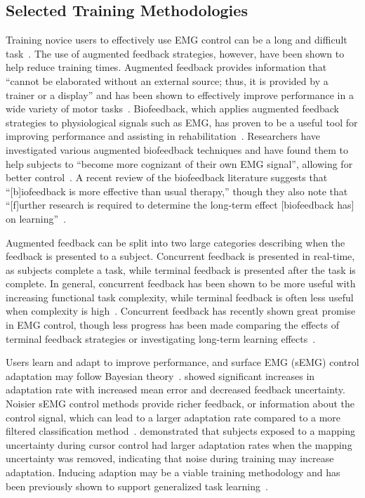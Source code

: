 \subsection{Selected Training Methodologies}
Training novice users to effectively use EMG control can be a long and difficult task~\citep{RN24}.
The use of augmented feedback strategies, however, have been shown to help reduce training times.
Augmented feedback provides information that ``cannot be elaborated without an external source; thus, it is provided by a trainer or a display'' and has been shown to effectively improve performance in a wide variety of motor tasks~\citep{sigrist_augmented_2013}.
Biofeedback, which applies augmented feedback strategies to physiological signals such as EMG, has proven to be a useful tool for improving performance and assisting in rehabilitation~\citep{RN26}.
Researchers have investigated various augmented biofeedback techniques and have found them to help subjects to ``become more cognizant of their own EMG signal'', allowing for better control~\citep{RN27}.
A recent review of the biofeedback literature suggests that ``[b]iofeedback is more effective than usual therapy,'' though they also note that ``[f]urther research is required to determine the long-term effect [biofeedback has] on learning''~\citep{RN28}.

Augmented feedback can be split into two large categories describing when the feedback is presented to a subject.
Concurrent feedback is presented in real-time, as subjects complete a task, while terminal feedback is presented after the task is complete.
In general, concurrent feedback has been shown to be more useful with increasing functional task complexity, while terminal feedback is often less useful when complexity is high~\citep{sigrist_augmented_2013}.
Concurrent feedback has recently shown great promise in EMG control, though less progress has been made comparing the effects of terminal feedback strategies or investigating long-term learning effects~\citep{RN29, RN30, RN31, RN32}.

\begin{mdframed}[hidealllines=true,backgroundcolor=blue!20]
	Users learn and adapt to improve performance, and surface EMG (sEMG) control adaptation may follow Bayesian theory~\citep{RN33}.
	\citeauthor{RN33} showed significant increases in adaptation rate with increased mean error and decreased feedback uncertainty.
	Noisier sEMG control methods provide richer feedback, or information about the control signal, which can lead to a larger adaptation rate compared to a more filtered classification method~\citep{RN34}.
	\citeauthor{RN35} demonstrated that subjects exposed to a mapping uncertainty during cursor control had larger adaptation rates when the mapping uncertainty was removed, indicating that noise during training may increase adaptation.
	Inducing adaption may be a viable training methodology and has been previously shown to support generalized task learning~\citep{RN36}.
\end{mdframed}

